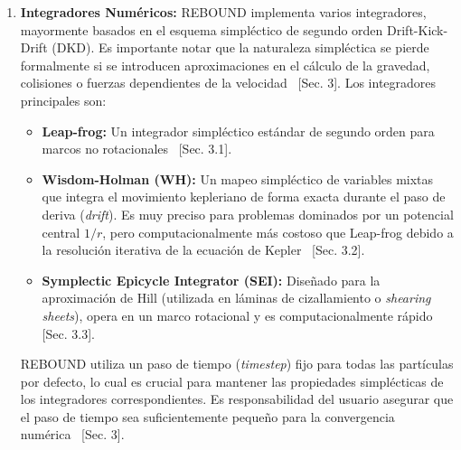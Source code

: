 \begin{enumerate}
    \item \textbf{Integradores Numéricos:} REBOUND implementa varios integradores, mayormente basados en el esquema simpléctico de segundo orden Drift-Kick-Drift (DKD). Es importante notar que la naturaleza simpléctica se pierde formalmente si se introducen aproximaciones en el cálculo de la gravedad, colisiones o fuerzas dependientes de la velocidad~\cite{Rein2012} [Sec. 3]. Los integradores principales son:
    \begin{itemize}
        \item \textbf{Leap-frog:} Un integrador simpléctico estándar de segundo orden para marcos no rotacionales~\cite{Rein2012} [Sec. 3.1].
        \item \textbf{Wisdom-Holman (WH):} Un mapeo simpléctico de variables mixtas que integra el movimiento kepleriano de forma exacta durante el paso de deriva (\textit{drift}). Es muy preciso para problemas dominados por un potencial central $1/r$, pero computacionalmente más costoso que Leap-frog debido a la resolución iterativa de la ecuación de Kepler~\cite{Rein2012} [Sec. 3.2].
        \item \textbf{Symplectic Epicycle Integrator (SEI):} Diseñado para la aproximación de Hill (utilizada en láminas de cizallamiento o \textit{shearing sheets}), opera en un marco rotacional y es computacionalmente rápido~\cite{Rein2012} [Sec. 3.3].
    \end{itemize}
    REBOUND utiliza un paso de tiempo (\textit{timestep}) fijo para todas las partículas por defecto, lo cual es crucial para mantener las propiedades simplécticas de los integradores correspondientes. Es responsabilidad del usuario asegurar que el paso de tiempo sea suficientemente pequeño para la convergencia numérica~\cite{Rein2012} [Sec. 3].


\end{enumerate}
